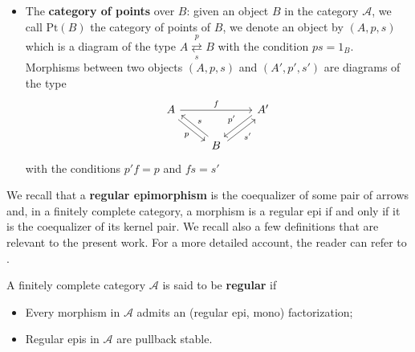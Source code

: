 \begin{itemize}
\[\begin{tikzcd}
    B \arrow[d, "\alpha"] &  & B \arrow[d, "\alpha"] \arrow[rd, "\alpha'"] &    \\
    A                     &  & A \arrow[r, "f"]                            & A'
    \end{tikzcd}
    \]
    \item The \textbf{category of points} over $B$: given an object $B$ in the category $\mathcal{A}$, we call $\mathrm{Pt}(B)$ the category of points of $B$, we denote an object by $(A,p,s)$ which is a diagram of the type $A \overset{p}{\underset{s}{\rightleftarrows}} B$ with the condition $ps=1_B$. Morphisms between two objects $(A,p,s)$ and $(A',p',s')$ are diagrams of the type 
    \[
    \begin{tikzcd}
    A \arrow[rd, "p"', shift right] \arrow[rr, "f"] &                                                                & A' \arrow[ld, "p'"', shift right] \\
                                                    & B \arrow[ru, "s'"', shift right] \arrow[lu, "s"', shift right] &                                  
    \end{tikzcd}
    \]
    with the conditions $p'f=p$ and $fs=s'$
\end{itemize}

We recall that a \textbf{regular epimorphism} is the
coequalizer of some pair of arrows and, in a finitely complete category,
a morphism is a regular epi if and only if it is the coequalizer of its
kernel pair. We recall also a few definitions that are relevant to the
present work. For a more detailed account, the reader can refer to \cite{BorceuxBourn2004}.

\begin{mainbox}{}
    \begin{defi}
        A finitely complete category $\mathcal{A}$ is said to be \textbf{regular} if
        \begin{itemize}
            \item Every morphism in $\mathcal{A}$ admits an (regular epi, mono) factorization;
            \item Regular epis in $\mathcal{A}$ are pullback stable.
        \end{itemize}
    \end{defi}
\end{mainbox}

